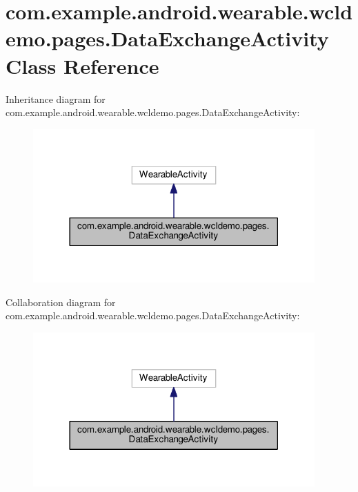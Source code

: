 \hypertarget{classcom_1_1example_1_1android_1_1wearable_1_1wcldemo_1_1pages_1_1DataExchangeActivity}{}\section{com.\+example.\+android.\+wearable.\+wcldemo.\+pages.\+Data\+Exchange\+Activity Class Reference}
\label{classcom_1_1example_1_1android_1_1wearable_1_1wcldemo_1_1pages_1_1DataExchangeActivity}


Inheritance diagram for com.\+example.\+android.\+wearable.\+wcldemo.\+pages.\+Data\+Exchange\+Activity\+:
\nopagebreak
\begin{figure}[H]
\begin{center}
\leavevmode
\includegraphics[width=306pt]{d7/d3d/classcom_1_1example_1_1android_1_1wearable_1_1wcldemo_1_1pages_1_1DataExchangeActivity__inherit__graph}
\end{center}
\end{figure}


Collaboration diagram for com.\+example.\+android.\+wearable.\+wcldemo.\+pages.\+Data\+Exchange\+Activity\+:
\nopagebreak
\begin{figure}[H]
\begin{center}
\leavevmode
\includegraphics[width=306pt]{de/d00/classcom_1_1example_1_1android_1_1wearable_1_1wcldemo_1_1pages_1_1DataExchangeActivity__coll__graph}
\end{center}
\end{figure}
